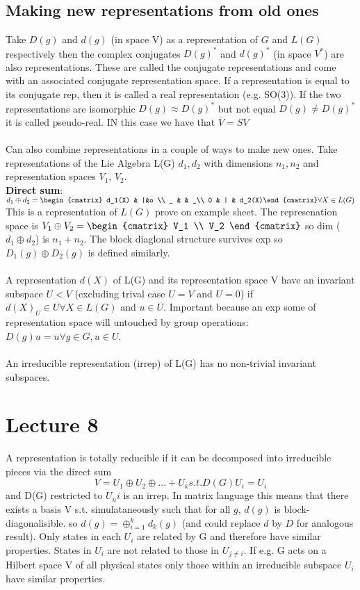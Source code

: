 \documentclass{article}
\begin{document}
{\subsection{Making new representations from old ones}
Take $D(g)$ and $d(g)$ (in space V) as a representation of $G$ and $L(G)$ respectively then the complex conjugates $D(g)^*$ and $d(g)^*$ (in space $V^*$) are also representations. These are called the conjugate representations and come with an associated conjugate representation space. If a representation is equal to its conjugate rep, then it is called a real representation (e.g. SO(3)). If the two representations are isomorphic $D(g) \approx D(g)^*$ but not equal $D(g) \neq D(g)^*$ it is called pseudo-real. IN this case we have that $\bar V = SV$\\\\
Can also combine representations in a couple of ways to make new ones. Take representations of the Lie Algebra L(G) $d_1, d_2$ with dimensions $n_1, n_2$ and representation spaces $V_1$, $V_2$.\\
\textbf{Direct sum}: $d_1 \oplus d_2 = \begin{cmatrix} d_1(X) & |&o \\
_ & & _\\
0 & | & d_2(X)\end{cmatrix} \forall X \in L(G)$
This is a representation of $L(G)$ prove on example sheet. The represenation space is $V_1 \oplus V_2 = \begin{cmatrix} V_1 \\ V_2 \end{cmatrix}$ so dim ($d_1 \oplus d_2$) is $n_1 + n_2$. The block diaglonal structure survives exp so $D_1(g) \oplus D_2(g)$ is defined similarly.\\\\ A representation $d(X)$ of L(G) and its representation space V have an invariant subspace $U < V$ (excluding trival case $U=V$ and $U= {0}$) if $d(X)_U \in U \forall X \in L(G)$ and $u\in U$. Important because an exp some of representation space will untouched by group operations: $D(g)u = u \forall g \in G, u \in U$.\\\\
An irreducible representation (irrep) of L(G) has no non-trivial invariant subspaces.
\section{Lecture 8}
A representation is totally reducible if it can be decomposed into irreducible pieces via the direct sum
$$
V = U_1 \oplus U_2 \oplus ... \plus U_k s.t. D(G) U_i = U_i
$$
and D(G) restricted to $U_ui$ is an irrep. In matrix language this means that there exists a basis V s.t. simulataneously such that for all $g$, $d(g)$ is block-diagonalisible. so $d(g) = \oplus_{i=1}^k d_k(g)$ (and could replace $d$ by $D$ for analogous result). Only states in each $U_i$ are related by G and therefore have similar properties. States in $U_i$ are not related to those in $U_{j\neq i}$. If e.g. G acts on a Hilbert space V of all physical states only those within an irreducible subspace $U_i$ have similar properties.
}
\end{document}
